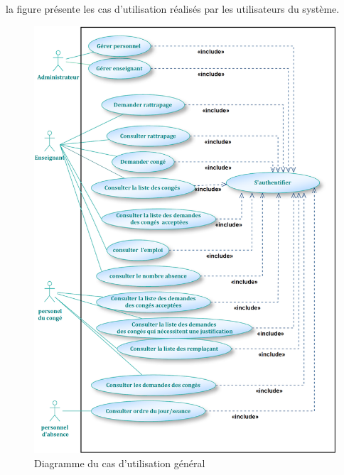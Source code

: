 \documentclass[12 pt]{report}
\begin{document}
la figure  présente les cas d’utilisation réalisés par les utilisateurs du système.
\begin{figure}[h]
 \begin{center}
\includegraphics[width= 18 cm ,height= 17 cm]{f.PNG}
\caption{Diagramme du cas d’utilisation général}
\end{center}
\end{figure}
\newpage
\end{document}
